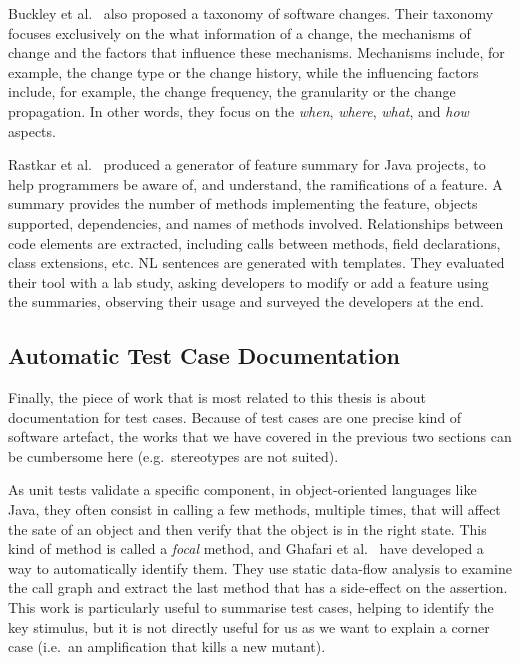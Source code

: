 \documentclass[11pt]{sdm_internship}
\newcommand{\rephrase}[1]{\colorbox{BlueViolet!60}{\textcolor{white}{\textbf{$\sim$#1}}}}
\theoremstyle{definition}
\begin{document}
Buckley et al.~\cite{buckley2005towards} also proposed a taxonomy of software changes.
Their taxonomy focuses exclusively on the what information of a change, the mechanisms of change and the factors that influence these mechanisms.
Mechanisms include, for example, the change type or the change history, while the influencing factors include, for example, the change frequency, the granularity or the change propagation.
In other words, they focus on the \textit{when}, \textit{where}, \textit{what}, and \textit{how} aspects.

Rastkar et al.~\cite{rastkar2011generating} produced a generator of feature summary for Java projects, to help programmers be aware of, and understand, the ramifications of a feature.
A summary provides the number of methods implementing the feature, objects supported, dependencies, and names of methods involved.
Relationships between code elements are extracted, including calls between methods, field declarations, class extensions, etc.
NL sentences are generated with templates.
They evaluated their tool with a lab study, asking developers to modify or add a feature using the summaries, observing their usage and surveyed the developers at the end.

\subsection{Automatic Test Case Documentation}%
\label{ssec:test_doc}
Finally, the piece of work that is most related to this thesis is about documentation for test cases.
Because of test cases are one precise kind of software artefact, the works that we have covered in the previous two sections can be cumbersome here (e.g.\ stereotypes are not suited).

As unit tests validate a specific component, in object-oriented languages like Java, they often consist in calling a few methods, multiple times, that will affect the sate of an object and then verify that the object is in the right state.
This kind of method is called a \emph{focal} method, and Ghafari et al.~\cite{ghafari2015automatically} have developed a way to automatically identify them.
They use static data-flow analysis to examine the call graph and extract the last method that has a side-effect on the assertion.
This work is particularly useful to summarise test cases, helping to identify the key stimulus, but it is not directly useful for us as we want to explain a corner case (i.e.\ an amplification that kills a new mutant).\rephrase{}
\end{document}
